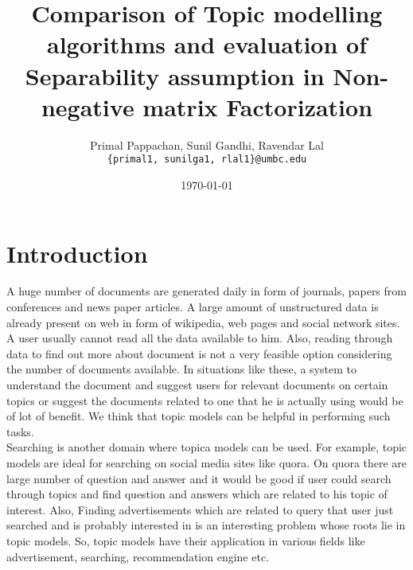 \documentclass[a4paper,11pt]{article}
\begin{document}

\title{Comparison of Topic modelling algorithms and evaluation of Separability assumption in Non-negative matrix Factorization}
\author{Primal Pappachan, Sunil Gandhi, Ravendar Lal \\ 
\texttt{\{primal1, sunilga1, rlal1\}@umbc.edu}}
\date{\today}
\maketitle


\section{Introduction}
A huge number of documents are generated daily in form of journals, papers from conferences and  news paper articles. A large amount of unstructured data is already present on web in form of wikipedia, web pages and social network sites. A user usually cannot read all the data available to him. Also, reading through data to find out more about document is not a very feasible option considering the number of documents available. In situations like these, a system to understand the document and suggest users for relevant documents on certain topics or suggest the documents related to one that he is actually using would be of lot of benefit. We think that topic models can be helpful in performing such tasks. \\

Searching is another domain where topica models can be used. For example, topic models are ideal for searching on social media sites like quora. On quora there are large number of question and answer and it would be good if user could search through topics and find question and answers which are related to his topic of interest. Also, Finding advertisements which are related to query that user just searched and is probably interested in is an interesting problem whose roots lie in topic models. So, topic models have their application in various fields like advertisement, searching, recommendation engine etc. \\
\end{document}
